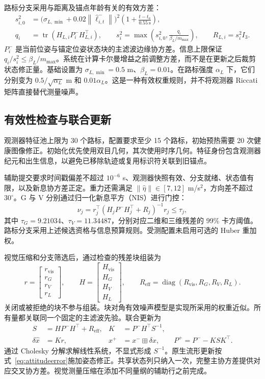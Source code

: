 \documentclass[a4paper,runningheads]{llncs}
\newcommand{\diag}{\operatorname{diag}}
\newcommand{\tr}{\operatorname{tr}}
\newcommand{\norm}[1]{\left\lVert #1\right\rVert}
\begin{document}
路标分支采用与距离及锚点年龄有关的有效方差：
\begin{align}
 s_{i,0}^2&=\big(\sigma_{L,\min}+0.02\norm{\hat\ell_{i,t}^{-}}\big)^2
       \left(1+\frac{t-t_a}{0.55~\mathrm{s}}\right),\\
 q_i&=\tr(H_{L,i}P_i^-H_{L,i}^{\top}),\qquad
 s_i^2=\max\left(s_{i,0}^2,\frac{q_i}{\beta_L/m_{\max}}\right),\qquad
 R_{L,i}=s_i^2 I_3 .
 \label{eq:lbudget}
\end{align}
$P_i^-$ 是当前位姿与锚定位姿状态块的主滤波边缘协方差。信息上限保证 $q_i/s_i^2\leq\beta_L/m_{\max}$。系统在计算卡尔曼增益之前调整方差，而不是在更新之后裁剪状态修正量。基础设置为 $\sigma_{L,\min}=0.5$ m、$\beta_L=0.01$。在路标强度 $\alpha_L$ 下，它们分别变为 $0.5/\sqrt{\alpha_L}$ m 和 $0.01\alpha_L$。这是一种有效权重规则，并不将观测器 Riccati 矩阵直接替代测量噪声。

\subsection{有效性检查与联合更新}
观测器特征池上限为 30 个路标，配置要求至少 15 个路标，初始预热需要 20 次健康图像修正。初始化优先使用双目几何，其次使用时序几何。特征身份包含观测器纪元和出生信息，以避免已移除轨迹或复用标识符关联到旧锚点。

辅助提交要求时间戳偏差不超过 $10^{-6}$ s、观测器快照有效、分支就绪、状态值有限，以及新息协方差正定。重力还需满足 $\norm{\hat\eta}\in[7,12]$ m/s$^2$，方向差不超过 $30^\circ$。G 与 V 分别通过归一化新息平方（NIS）进行门控：
\begin{equation}
 \nu_j=r_j^\top(H_jP^-H_j^\top+R_j)^{-1}r_j\leq\tau_j ,
 \label{eq:nis}
\end{equation}
其中 $\tau_G=9.21034$、$\tau_V=11.34487$，分别对应二维和三维残差的 99\% 卡方阈值。路标分支采用上述候选资格与信息预算规则。受测配置未启用可选的 Huber 重加权。

视觉压缩和分支筛选后，通过检查的残差块组装为
\begin{equation}
 r=\begin{bmatrix}r_{\mathrm{vis}}\\r_G\\r_V\\r_L\end{bmatrix},\qquad
 H=\begin{bmatrix}H_{\mathrm{vis}}\\H_G\\H_V\\H_L\end{bmatrix},\qquad
 R_{\mathrm{eff}}=\diag(R_{\mathrm{vis}},R_G,R_V,R_L).
 \label{eq:joint}
\end{equation}
关闭或被拒绝的块不参与组装。块对角有效噪声模型是实现所采用的权重近似。所有量都关联同一个固定的主滤波先验。联合更新为
\begin{align}
 S&=HP^-H^\top+R_{\mathrm{eff}},&
 K&=P^-H^\top S^{-1},\\
 \delta\hat x&=Kr,&
 x^+&=x^-\boxplus\delta\hat x,\qquad
 P^+=P^--KSK^\top .
 \label{eq:ekf}
\end{align}
通过 Cholesky 分解求解线性系统，不显式形成 $S^{-1}$。原生流形更新按式~\eqref{eq:attitudeerror}施加姿态修正。共享状态列只纳入一次，完整主协方差提供对应交叉协方差。视觉测量压缩在添加不同量纲的辅助行之前完成。
\end{document}

